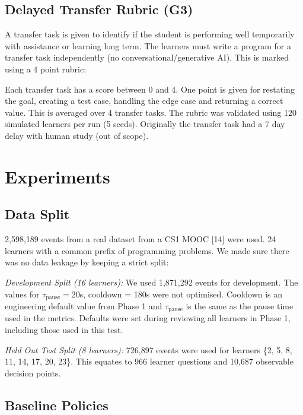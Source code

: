 \documentclass[conference]{IEEEtran}
\begin{document}
\subsection{Delayed Transfer Rubric (G3)}

A transfer task is given to identify if the student is performing well temporarily with assistance or learning long term. The learners must write a program for a transfer task independently (no conversational/generative AI). This is marked using a 4 point rubric:

Each transfer task has a score between 0 and 4. One point is given for restating the goal, creating a test case, handling the edge case and returning a correct value. This is averaged over 4 transfer tasks. The rubric was validated using 120 simulated learners per run (5 seeds). Originally the transfer task had a 7 day delay with human study (out of scope).

\section{Experiments}

\subsection{Data Split}

2,598,189 events from a real dataset from a CS1 MOOC [14] were used. 24 learners with a common prefix of programming problems. We made sure there was no data leakage by keeping a strict split:

\textit{Development Split (16 learners):} We used 1,871,292 events for development. The values for $\tau_{\text{pause}} = 20$s, cooldown = 180s were not optimised. Cooldown is an engineering default value from Phase 1 and $\tau_{\text{pause}}$ is the same as the pause time used in the metrics. Defaults were set during reviewing all learners in Phase 1, including those used in this test.

\textit{Held Out Test Split (8 learners):} 726,897 events were used for learners \{2, 5, 8, 11, 14, 17, 20, 23\}. This equates to 966 learner questions and 10,687 observable decision points.

\subsection{Baseline Policies}
\end{document}
